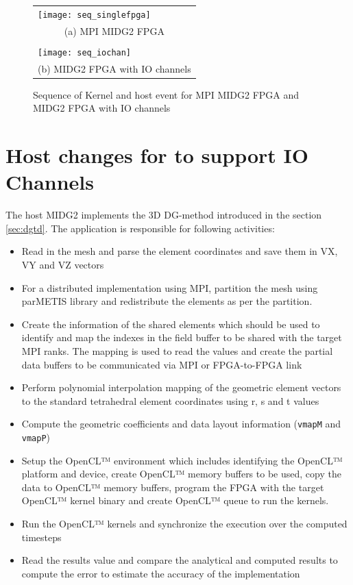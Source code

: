 \begin{figure}[h]
	\centering\small
	\begin{tabular}{l@{\hskip 0.5in}}
        \texttt{[image: seq\_singlefpga]} \\
        \multicolumn{1}{c}{(a) MPI MIDG2 FPGA}  \\
        \\
        \texttt{[image: seq\_iochan]} \\
        \multicolumn{1}{c}{(b) MIDG2 FPGA with IO channels}
	\end{tabular}
    \caption{Sequence of Kernel and host event for MPI MIDG2 FPGA
    and MIDG2 FPGA with IO channels}
	\label{fig:sequence_comp}
\end{figure}

\section{Host changes for to support IO Channels}

The host MIDG2 implements the 3D DG-method introduced in the section \ref{sec:dgtd}.
The application is responsible for following activities:

\begin{itemize}
    \item Read in the mesh and parse the element coordinates and save them in VX, VY and VZ vectors
    \item For a distributed implementation using MPI, partition the mesh using parMETIS library
    and redistribute the elements as per the partition.
    \item Create the information of the shared elements which should be used to identify and map the
    indexes in the field buffer to be shared with the target MPI ranks. The mapping is used to read the
    values and create the partial data buffers to be communicated via MPI or FPGA-to-FPGA link
    \item Perform polynomial interpolation mapping of the geometric element vectors to the standard tetrahedral
    element coordinates using r, s and t values
    \item Compute the geometric coefficients and data layout information (\texttt{vmapM} and \texttt{vmapP})
    \item Setup the OpenCL™ environment which includes identifying the OpenCL™ platform and device,
    create OpenCL™ memory buffers to be used, copy the data to OpenCL™ memory buffers, program the FPGA with the
    target OpenCL™ kernel binary and create OpenCL™ queue to run the kernels.
    \item Run the OpenCL™ kernels and synchronize the execution over the computed timesteps
    \item Read the results value and compare the analytical and computed results to compute the error
    to estimate the accuracy of the implementation
\end{itemize}

